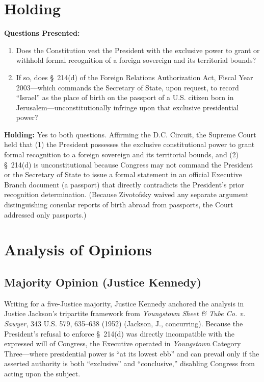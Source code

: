 \documentclass[12pt]{article}
\begin{document}
\section{Holding}
\textbf{Questions Presented:}

\begin{enumerate}
  \item Does the Constitution vest the President with the exclusive power to grant or withhold formal recognition of a foreign sovereign and its territorial bounds?
  \item If so, does \S~214(d) of the Foreign Relations Authorization Act, Fiscal Year 2003---which commands the Secretary of State, upon request, to record ``Israel'' as the place of birth on the passport of a U.S. citizen born in Jerusalem---unconstitutionally infringe upon that exclusive presidential power?
\end{enumerate}

\textbf{Holding:} Yes to both questions. Affirming the D.C. Circuit, the Supreme Court held that (1) the President possesses the exclusive constitutional power to grant formal recognition to a foreign sovereign and its territorial bounds, and (2) \S~214(d) is unconstitutional because Congress may not command the President or the Secretary of State to issue a formal statement in an official Executive Branch document (a passport) that directly contradicts the President's prior recognition determination. (Because Zivotofsky waived any separate argument distinguishing consular reports of birth abroad from passports, the Court addressed only passports.)

\section{Analysis of Opinions}
\subsection{Majority Opinion (Justice Kennedy)}

Writing for a five-Justice majority, Justice Kennedy anchored the analysis in Justice Jackson's tripartite framework from \textit{Youngstown Sheet \& Tube Co. v. Sawyer}, 343 U.S. 579, 635--638 (1952) (Jackson, J., concurring). Because the President's refusal to enforce \S~214(d) was directly incompatible with the expressed will of Congress, the Executive operated in \textit{Youngstown} Category Three---where presidential power is ``at its lowest ebb'' and can prevail only if the asserted authority is both ``exclusive'' and ``conclusive,'' disabling Congress from acting upon the subject.
\end{document}

